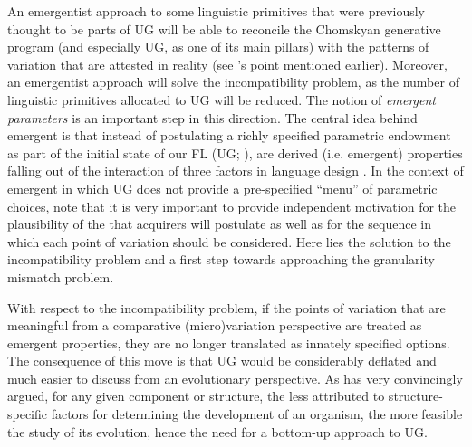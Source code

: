 \documentclass[output=paper]{langsci/langscibook}
\begin{document}
An emergentist approach to some linguistic primitives that were previously
thought to be parts of \gls{UG} will be able to reconcile
the Chomskyan generative program (and especially \gls{UG}, as one of its main
pillars) with the patterns of variation that are attested in reality (see
\citeauthor{Yang2004}’s \citeyear{Yang2004} point mentioned earlier). Moreover,
an emergentist approach will solve the incompatibility problem, as the number
of linguistic primitives allocated to \gls{UG} will be reduced. The notion of
\emph{emergent parameters}
\parencite{RobHol2010,Roberts2012,BibRobShee2014,BibRob2017} is an important
step in this direction. The central idea behind emergent  is
that instead of postulating a richly specified parametric endowment as part of
the initial state of our \gls{FL} (UG; \citealt{Chomsky1981}), 
are derived (i.e. emergent) properties falling out of the interaction of
 three factors in language design
\citep{BibHolRobShee2014}. In the context of emergent  in which
\gls{UG} does not provide a pre-specified \enquote{menu} of parametric choices,
\citet{BibRobShee2014} note that it is very important to provide independent
motivation for the plausibility of the  that acquirers will
postulate as well as for the sequence in which each point of variation should
be considered. Here lies the solution to the incompatibility problem and a
first step towards approaching the granularity mismatch problem.

With respect to the incompatibility problem, if the points of variation that
are meaningful from a comparative (micro)variation perspective are treated as
emergent properties, they are no longer translated as innately specified
options. The consequence of this move is that \gls{UG} would be considerably
deflated and much easier to discuss from an evolutionary perspective. As
\citet{Chomsky2007} has very convincingly argued, for any given component or
structure, the less attributed to structure-specific factors for determining
the development of an organism, the more feasible the study of its evolution,
hence the need for a bottom-up approach to \gls{UG}.
\end{document}
